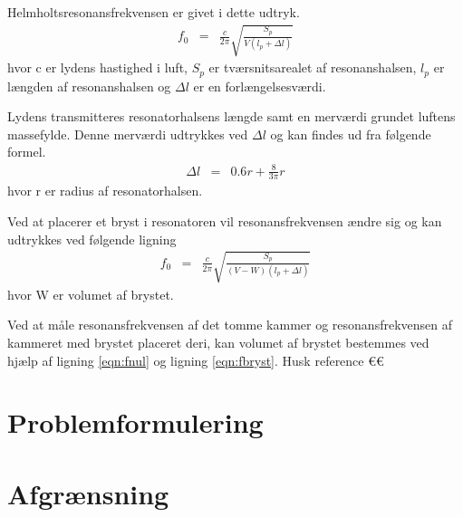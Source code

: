  
Helmholtsresonansfrekvensen er givet i dette udtryk. 
\begin{eqnarray}
\label{eqn:fnul}
f_{0}&=&\frac{c}{2\pi}\sqrt{\frac{S_{p}}{V \left(l_{p}+\Delta l\right)}}
\end{eqnarray}
hvor c er lydens hastighed i luft, $S_{p}$ er tværsnitsarealet af resonanshalsen, $l_{p}$ er længden af resonanshalsen og $\Delta l$ er en forlængelsesværdi. 

Lydens transmitteres resonatorhalsens længde samt en merværdi grundet luftens massefylde. Denne merværdi udtrykkes ved $\Delta l$ og kan findes ud fra følgende formel. 
\begin{eqnarray}
\Delta l&=&0.6r+\frac{8}{3\pi}r
\end{eqnarray}
hvor r er radius af resonatorhalsen.

Ved at placerer et bryst i resonatoren vil resonansfrekvensen ændre sig og kan udtrykkes ved følgende ligning
\begin{eqnarray}
\label{eqn:fbryst}
f_{0}&=&\frac{c}{2\pi}\sqrt{\frac{S_{p}}{(V-W)\left(l_{p}+\Delta l\right)}}
\end{eqnarray}
hvor W er volumet af brystet. 

Ved at måle resonansfrekvensen af det tomme kammer og resonansfrekvensen af kammeret med brystet placeret deri, kan volumet af brystet bestemmes ved hjælp af ligning \ref{eqn:fnul} og ligning \ref{eqn:fbryst}. Husk reference €€









\section{Problemformulering}

\section{Afgrænsning}
